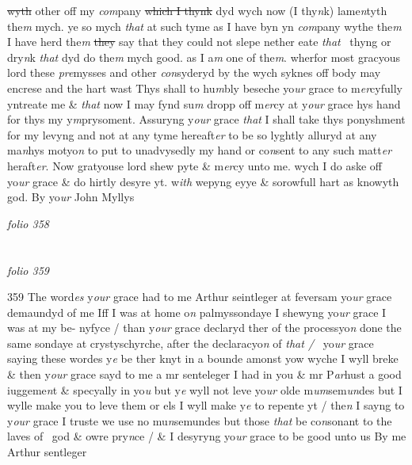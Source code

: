 \documentclass[12pt, a4paper]{book}
\begin{document}
               \sout{wyth} other off my \textit{com}pany \sout{which I thynk} dyd wych now (I thy\textit{n}k) lame\textit{n}tyth the\textit{m} mych. ye so mych \textit{that} at such tyme as I have byn yn \textit{com}pany wythe the\textit{m} I have herd the\textit{m}
               \sout{they }say that they could not slepe nether eate \textit{that}  thyng or dry\textit{n}k \textit{that }dyd do the\textit{m} mych good. as I a\textit{m} one of the\textit{m}. wherfor most gracyous lord these \textit{pre}mysses and other \textit{con}syderyd by the wych syknes off body may encrese and the hart wast Thys shall to hu\textit{m}bly beseche yo\textit{ur } grace to m\textit{er}cyfully yntreate me \& \textit{that }now I may fynd su\textit{m} dropp off m\textit{er}cy at y\textit{our} grace hys hand for thys my y\textit{m}prysoment. Assuryng y\textit{our} grace \textit{that} I shall take thys ponyshment for my levyng and not at any tyme hereaft\textit{er} to be so lyghtly alluryd at any ma\textit{n}hys motyo\textit{n} to put to  unadvysedly my hand or co\textit{n}sent to any such matt\textit{er} heraft\textit{er}. Now gratyouse lord shew pyte \& m\textit{er}cy unto me. wych I do aske off yo\textit{ur }grace \& do hirtly desyre yt. w\textit{ith} wepyng eyye \& sorowfull  hart as knowyth god.  By yo\textit{ur} John Myllys

\dotfill
					

\textit{folio 358}


         \vspace{4cm}
         
\dotfill
					  \section*{}  \subsection*{}

\textit{folio 359}



{\color{Mahogany}359} The word\textit{es} y\textit{our} grace had to me Arthur  seintleger at feversam  yo\textit{ur} grace demaundyd of me Iff I was at home o\textit{n}  palmyssondaye I shewyng yo\textit{ur} grace I was at my be- nyfyce / than y\textit{our} grace declaryd ther of the processyo\textit{n} done the same sondaye at crystyschyrche, after the  declaracyo\textit{n} of \textit{that /}  yo\textit{ur} grace saying these wordes y\textit{e} be ther knyt in a bounde amonst yow wyche I wyll breke \& then y\textit{our} grace sayd to me a mr senteleger I had in you \& mr P\textit{ar}hust a good iuggeme\textit{n}t \& specyally in yo\textit{u} but y\textit{e} wyll not leve yo\textit{ur} olde m\textit{um}sem\textit{un}des but I wylle make you to leve them or els I wyll make y\textit{e} to repente yt / the\textit{n} I sayng to y\textit{our} grace I truste we use no  mu\textit{n}semundes but those \textit{that} be co\textit{n}sonant to the laves of  god \& owre pry\textit{n}ce / \& I desyryng yo\textit{ur} grace to be good  unto us By me Arthur sentleger
\end{document}
